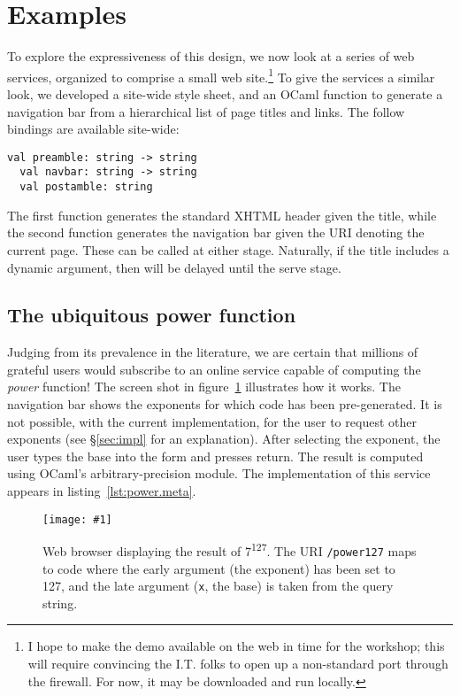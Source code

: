 \documentclass[preprint]{acm_proc_article-sp}
\newcommand{\myfig}[3]{%
  \begin{figure}[tbp]%
    #3%
    \caption{#2}%
    \label{fig:#1}%
  \end{figure}}
\newcommand{\screenshot}[2]{%
  \myfig{#1}{#2}
  {\centering%
    \texttt{[image: \#1]}}}
\begin{document}
\section{Examples}
\label{sec:eg}

To explore the expressiveness of this design, we now look at a
series of web services, organized to comprise a small web
site.\footnote{I hope to make the demo available on the web in time
  for the workshop; this will require convincing the I.T. folks to
  open up a non-standard port through the firewall.  For now, it may
  be downloaded and run locally.} %
To give the services a similar look, we developed a site-wide style
sheet, and an OCaml function to generate a navigation bar from a
hierarchical list of page titles and links.  The follow bindings are
available site-wide:
\begin{lstlisting}[numbers=none]
  val preamble: string -> string
  val navbar: string -> string
  val postamble: string
\end{lstlisting}
The first function generates the standard XHTML header given the
title, while the second function generates the navigation bar given
the URI denoting the current page.  These can be called at either
stage.  Naturally, if the title includes a dynamic argument, then
 will be delayed until the serve stage.

\subsection{The ubiquitous power function}
\label{sec:eg:power}

Judging from its prevalence in the literature, we are certain that
millions of grateful users would subscribe to an online service
capable of computing the \emph{power} function!  The screen shot in
figure~\ref{fig:power127} illustrates how it works.  The navigation
bar shows the exponents for which code has been pre-generated.  It is
not possible, with the current implementation, for the user to request
other exponents (see \S\ref{sec:impl} for an explanation).  After
selecting the exponent, the user types the base into the form and
presses return.  The result is computed using OCaml's
arbitrary-precision  module.  The implementation of this
service appears in listing~\ref{lst:power.meta}.

\screenshot{power127}{Web browser displaying the result of
  7\textsuperscript{127}.  The URI \texttt{/power127} maps to code
  where the early argument (the exponent) has been set to 127, and the
  late argument (\texttt{x}, the base) is taken from the query
  string.}
\end{document}
